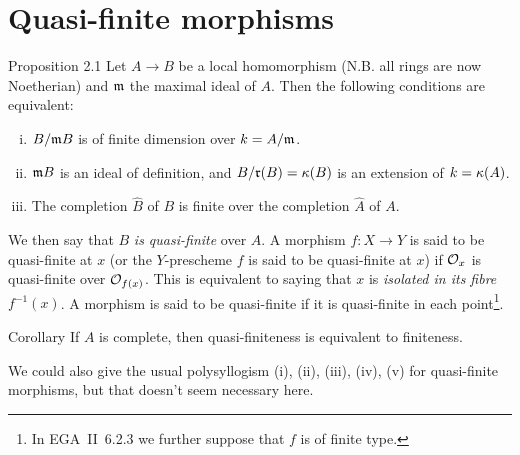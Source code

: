 \section{Quasi-finite morphisms}
\label{I.2}

\begin{itenv}{Proposition 2.1}
  Let $A\to B$ be a local homomorphism (N.B. all rings are now Noetherian) and $\frak{m}$ the maximal ideal of $A$.
  Then the following conditions are equivalent:
  \begin{enumerate}[(i)]
    \item $B/\frak{m}B$ is of finite dimension over $k=A/\frak{m}$.
    \item $\frak{m}B$ is an ideal of definition, and $B/\frak{r}(B)=\kres(B)$ is an extension of $k=\kres(A)$.
    \item The completion $\widehat{B}$ of $B$ is finite over the completion $\widehat{A}$ of $A$.
  \end{enumerate}
\end{itenv}

We then say that $B$ \emph{is quasi-finite} over $A$.
A morphism $f\colon X\to Y$ is said to be quasi-finite at $x$ (or the $Y$-prescheme $f$ is said to be quasi-finite at $x$) if $\cal{O}_x$ is quasi-finite over $\cal{O}_{f(x)}$.
This is equivalent to saying that $x$ is \emph{isolated in its fibre $f^{-1}(x)$}.
A morphism is said to be quasi-finite if it is quasi-finite in each point\footnote{In EGA~II~6.2.3 we further suppose that $f$ is of finite type.}.

\begin{itenv}{Corollary}
    If $A$ is complete, then quasi-finiteness is equivalent to finiteness.
\end{itenv}

We could also give the usual polysyllogism (i), (ii), (iii), (iv), (v) for quasi-finite morphisms, but that doesn't seem necessary here.
